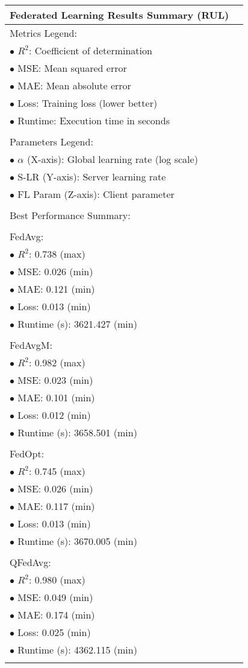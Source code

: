 \documentclass[border=5pt]{standalone}
\begin{document}
    \begin{tabular}{>{\raggedright\arraybackslash}p{5cm}l}
    \toprule
    \textbf{Federated Learning Results Summary (RUL)} & \\
    \midrule
    Metrics Legend:\\
$\bullet$ $R^2$: Coefficient of determination\\
$\bullet$ MSE: Mean squared error\\
$\bullet$ MAE: Mean absolute error\\
$\bullet$ Loss: Training loss (lower better)\\
$\bullet$ Runtime: Execution time in seconds\\
\\
Parameters Legend:\\
$\bullet$ $\alpha$ (X-axis): Global learning rate (log scale)\\
$\bullet$ S-LR (Y-axis): Server learning rate\\
$\bullet$ FL Param (Z-axis): Client parameter\\
\\
Best Performance Summary:\\
\\
FedAvg:\\
$\bullet$ $R^2$: 0.738 (max)\\
$\bullet$ MSE: 0.026 (min)\\
$\bullet$ MAE: 0.121 (min)\\
$\bullet$ Loss: 0.013 (min)\\
$\bullet$ Runtime (s): 3621.427 (min)\\
\\
FedAvgM:\\
$\bullet$ $R^2$: 0.982 (max)\\
$\bullet$ MSE: 0.023 (min)\\
$\bullet$ MAE: 0.101 (min)\\
$\bullet$ Loss: 0.012 (min)\\
$\bullet$ Runtime (s): 3658.501 (min)\\
\\
FedOpt:\\
$\bullet$ $R^2$: 0.745 (max)\\
$\bullet$ MSE: 0.026 (min)\\
$\bullet$ MAE: 0.117 (min)\\
$\bullet$ Loss: 0.013 (min)\\
$\bullet$ Runtime (s): 3670.005 (min)\\
\\
QFedAvg:\\
$\bullet$ $R^2$: 0.980 (max)\\
$\bullet$ MSE: 0.049 (min)\\
$\bullet$ MAE: 0.174 (min)\\
$\bullet$ Loss: 0.025 (min)\\
$\bullet$ Runtime (s): 4362.115 (min)\\
\\

    \bottomrule
    \end{tabular}
    
\end{document}
